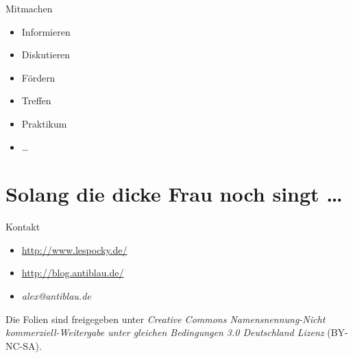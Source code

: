 \documentclass{beamer}
\begin{document}
\begin{frame}{Mitmachen}
    \begin{itemize}
        \item Informieren
        \item Diskutieren
        \item Fördern
        \item Treffen
        \item Praktikum
        \item \dots
    \end{itemize}
\end{frame}

\section*{Solang die dicke Frau noch singt \dots}

\begin{frame}{Kontakt}
    \begin{itemize}
        \item \url{http://www.lespocky.de/}
        \item \url{http://blog.antiblau.de/}
        \item \emph{alex@antiblau.de}
    \end{itemize}

    \vspace{1em}
    \small
    Die Folien sind freigegeben unter \emph{Creative Commons
    Namensnennung-Nicht kommerziell-Weitergabe unter gleichen
    Bedingungen 3.0 Deutschland Lizenz} (BY-NC-SA).
    \normalsize
\end{frame}
\end{document}
